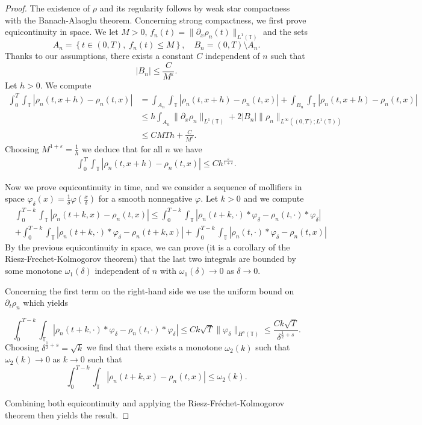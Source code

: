 \documentclass[a4paper,twosided, 11pt]{article}
\newcommand {\T}  { {\mathbb{T}} }
\theoremstyle{plain}
\theoremstyle{remark}
\numberwithin{equation}{section}
\begin{document}
\begin{proof}
The existence of $\rho$ and its regularity follows by weak star compactness with the Banach-Alaoglu theorem. Concerning strong compactness, we first prove equicontinuity in space. We let $M>0$, $f_n(t)=\|\partial_x\rho_n(t)\|_{L^{1}(\T)}$ and the sets 
$$
A_n = \left\{t\in(0,T),\; f_n(t)\le M\right\}, \quad B_n=(0,T)\setminus A_n.
$$
Thanks to our assumptions, there exists a constant $C$ independent of $n$ such that 
$$
|B_n|\le \frac{C}{M^{\varepsilon}}.
$$
Let $h>0$. We compute
\begin{align*}
\int_{0}^{T}\int_{\T}|\rho_n(t,x+h)-\rho_n(t,x)|&= \int_{A_n}\int_{\T}|\rho_n(t,x+h)-\rho_n(t,x)| + \int_{B_n}\int_{\T}|\rho_n(t,x+h)-\rho_n(t,x)|\\
&\le h \int_{A_n} \|\partial_x\rho_n\|_{L^{1}(\T)} + 2|B_n|\|\rho_n\|_{L^{\infty}((0,T);L^{1}(\T))}\\
&\le CMTh + \frac{C}{M^{\varepsilon}}.
\end{align*}
Choosing $M^{1+\varepsilon} = \frac{1}{h}$ we deduce that for all $n$ we have
\begin{align*}
\int_{0}^{T}\int_{\T}|\rho_n(t,x+h)-\rho_n(t,x)|\le Ch^{\frac{\varepsilon}{1+\varepsilon}}.
\end{align*}

Now we prove equicontinuity in time, and we consider a sequence of  mollifiers in space $\varphi_{\delta}(x)=\frac{1}{\delta}\varphi\left(\frac{x}{\delta}\right)$ for a smooth  nonnegative $\varphi$. Let $k>0$ and we compute
\begin{align*}
&\int_{0}^{T-k}\int_{\T}|\rho_n(t+k,x)-\rho_n(t,x)|\le \int_{0}^{T-k}\int_{\T}|\rho_n(t+k,\cdot)\ast\varphi_{\delta} -\rho_n(t,\cdot)\ast\varphi_\delta| \\ &+ \int_{0}^{T-k}\int_{\T}|\rho_n(t+k,\cdot)\ast\varphi_\delta-\rho_n(t+k,x)|+ \int_{0}^{T-k}\int_{\T}|\rho_n(t,\cdot)\ast\varphi_\delta-\rho_n(t,x)|
\end{align*}
By the previous equicontinuity in space, we can prove (it is a corollary of the Riesz-Frechet-Kolmogorov theorem) that the last two integrals are bounded by some monotone $\omega_1(\delta)$ independent of $n$ with $\omega_1(\delta)\to 0$ as $\delta\to 0$.    

Concerning the first term on the right-hand side we use the uniform  bound on $\partial_t\rho_n$ which yields 

$$
\int_{0}^{T-k}\int_{\T}|\rho_n(t+k,\cdot)\ast\varphi_{\delta} -\rho_n(t,\cdot)\ast\varphi_\delta|\le Ck\sqrt{T}\|\varphi_\delta\|_{H^{s}(\T)}\le \frac{Ck\sqrt{T}}{\delta^{\frac{1}{2}+s}}.
$$
Choosing $\delta^{\frac{1}{2}+s}=\sqrt{k}$ we find that there exists a monotone $\omega_{2}(k)$ such that $\omega_{2}(k)\to 0$ as $k\to 0$ such that
$$
\int_{0}^{T-k}\int_{\T}|\rho_n(t+k,x)-\rho_n(t,x)|\le \omega_{2}(k).
$$

Combining both equicontinuity and applying the Riesz-Fréchet-Kolmogorov theorem then yields the result. 
\end{proof}
\end{document}
